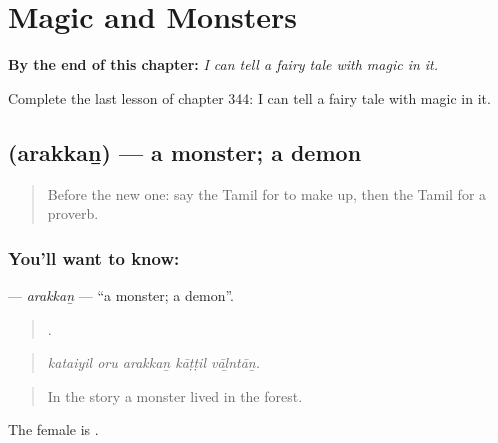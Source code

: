 
\chapter{Magic and Monsters}
\label{ch:ta-magic-and-monsters}

\begin{chapteropening}
\textbf{By the end of this chapter:} \emph{I can tell a fairy tale with magic in it.}

Complete the last lesson of chapter 344: I can tell a fairy tale with magic in it.
\end{chapteropening}

\section[\texorpdfstring{\ta{அரக்கன்} (arakkaṉ)}{அரக்கன் (arakkaṉ)}]{ (arakkaṉ) — a monster; a demon}

\label{lesson:TA-C344-arakkan}



\begin{quote}
Before the new one: say the Tamil for to make up, then the Tamil for a proverb.
\end{quote}

\subsection*{You'll want to know: }
\textbf{} — \emph{arakkaṉ} — \textquotedblleft{}a monster; a demon\textquotedblright{}.

\begin{quote}
    .
\end{quote}

\begin{quote}
\emph{kataiyil oru arakkaṉ kāṭṭil vāḻntāṉ.}
\end{quote}

\begin{quote}
In the story a monster lived in the forest.
\end{quote}

The female is .

